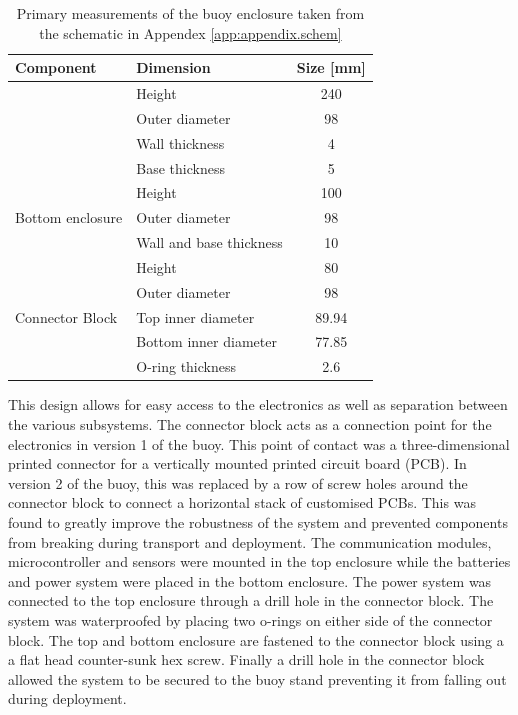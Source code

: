 \begin{table}[H]
	\centering
	\caption{Primary measurements of the buoy enclosure taken from the schematic in Appendex \ref{app:appendix.schem}}
	\setlength{\extrarowheight}{5pt}
	\begin{tabular}{l  l c}
		\hline
		\textbf{Component} &   \textbf{Dimension} &   \textbf{Size [mm]} \\
		\hline
		\hline
		\setlength{\extrarowheight}{2.5pt}
		\multirow{4}{*}{Top Enclosure} & Height & 240\\
		&  Outer diameter & 98  \\
		&  Wall thickness & 4 \\ 
		&  Base thickness & 5 \\
		\hline
		\multirow{3}{*}{Bottom enclosure} & Height & 100\\
		& Outer diameter & 98  \\
		& Wall and base thickness & 10 \\ 
		\hline
		\multirow{5}{*}{Connector Block} & Height & 80\\
		&  Outer diameter & 98  \\
		&  Top inner diameter & 89.94  \\ 
		&  Bottom inner diameter & 77.85\\
		&  O-ring thickness & 2.6 \\
		\hline
		\hline
	\end{tabular}
	
	\label{tab:enc_meas}
\end{table}

This design allows for easy access to the electronics as well as separation between the various subsystems. The connector block acts as a connection point for the electronics in version 1 of the buoy. This point of contact was a three-dimensional printed connector for a vertically mounted printed circuit board (PCB). In version 2 of the buoy, this was replaced by a row of screw holes around the connector block to connect a horizontal stack of customised PCBs. This was found to greatly improve the robustness of the system and prevented components from breaking during transport and deployment. The communication modules, microcontroller and sensors were mounted in the top enclosure while the batteries and power system were placed in the bottom enclosure. The power system was connected to the top enclosure through a drill hole in the connector block. The system was waterproofed by placing two o-rings on either side of the connector block. The top and bottom enclosure are fastened to the connector block using a a flat head counter-sunk hex screw. Finally a drill hole in the connector block allowed the system to be secured to the buoy stand preventing it from falling out during deployment.

